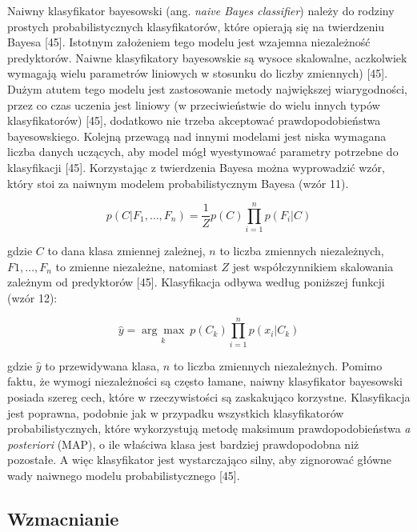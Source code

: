Naiwny klasyfikator bayesowski (ang. \textit{naive Bayes classifier}) należy do rodziny prostych probabilistycznych klasyfikatorów, które opierają się na twierdzeniu Bayesa [45]. Istotnym założeniem tego modelu jest wzajemna niezależność predyktorów. Naiwne klasyfikatory bayesowskie są wysoce skalowalne, aczkolwiek wymagają wielu parametrów liniowych w stosunku do liczby zmiennych) [45]. Dużym atutem tego modelu jest zastosowanie metody największej wiarygodności, przez co czas uczenia jest liniowy (w przeciwieństwie do wielu innych typów klasyfikatorów) [45], dodatkowo nie trzeba akceptować prawdopodobieństwa bayesowskiego. Kolejną przewagą nad innymi modelami jest niska wymagana liczba danych uczących, aby model mógł wyestymować parametry potrzebne do klasyfikacji [45]. Korzystając z twierdzenia Bayesa można wyprowadzić wzór, który stoi za naiwnym modelem probabilistycznym Bayesa (wzór 11).

\begin{equation}
	p(C|F_1,\dots,F_n)=\frac 1 Zp(C)\prod_{i=1}^{n}p(F_i|C)
\end{equation}

\noindent gdzie $C$ to dana klasa zmiennej zależnej, $n$ to liczba zmiennych niezależnych, $F1,\dots,F_n$ to zmienne niezależne, natomiast $Z$ jest współczynnikiem skalowania zależnym od predyktorów [45]. Klasyfikacja odbywa według poniższej funkcji (wzór 12):

\begin{equation}
	\hat y=\underset{k}{\arg\max}\ p(C_k)\prod_{i=1}^{n}p(x_i|C_k)
\end{equation}

\noindent gdzie $\hat{y}$ to przewidywana klasa, $n$ to liczba zmiennych niezależnych. Pomimo faktu, że wymogi niezależności są często łamane, naiwny klasyfikator bayesowski posiada szereg cech, które w rzeczywistości są zaskakująco korzystne. Klasyfikacja jest poprawna, podobnie jak w przypadku wszystkich klasyfikatorów probabilistycznych, które wykorzystują metodę maksimum prawdopodobieństwa \textit{a posteriori} (MAP), o ile właściwa klasa jest bardziej prawdopodobna niż pozostałe. A więc klasyfikator jest wystarczająco silny, aby zignorować główne wady naiwnego modelu probabilistycznego [45].


\subsection{Wzmacnianie}
\label{cha:Wzmacnianie}

